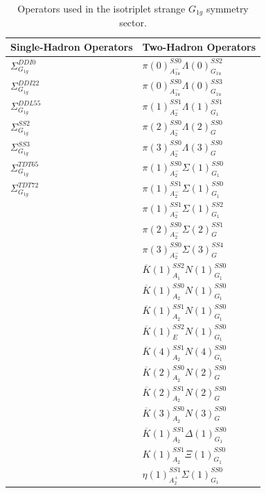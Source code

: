 \begin{table}
    \centering
    \begin{tabular}{l|l}
        \textbf{Single-Hadron Operators} & \textbf{Two-Hadron Operators} \\
        \hline
        $\Sigma_{G_{1g}}^{DDI0}$ & $\pi(0)_{A_{1u}^-}^{SS0}\Lambda(0)_{G_{1u}}^{SS2}$\\
        $\Sigma_{G_{1g}}^{DDI22}$ & $\pi(0)_{A_{1u}^-}^{SS0}\Lambda(0)_{G_{1u}}^{SS3}$\\
        $\Sigma_{G_{1g}}^{DDL55}$ & $\pi(1)_{A_2^-}^{SS1}\Lambda(1)_{G_1}^{SS1}$\\
        $\Sigma_{G_{1g}}^{SS2}$ & $\pi(2)_{A_2^-}^{SS0}\Lambda(2)_{G}^{SS0}$\\
        $\Sigma_{G_{1g}}^{SS3}$ & $\pi(3)_{A_2^-}^{SS0}\Lambda(3)_{G}^{SS0}$\\
        $\Sigma_{G_{1g}}^{TDT65}$ & $\pi(1)_{A_2^-}^{SS0}\Sigma(1)_{G_1}^{SS0}$\\
        $\Sigma_{G_{1g}}^{TDT72}$ & $\pi(1)_{A_2^-}^{SS1}\Sigma(1)_{G_1}^{SS0}$\\
        & $\pi(1)_{A_2^-}^{SS1}\Sigma(1)_{G_1}^{SS2}$\\
        & $\pi(2)_{A_2^-}^{SS0}\Sigma(2)_{G}^{SS1}$\\
        & $\pi(3)_{A_2^-}^{SS0}\Sigma(3)_{G}^{SS4}$\\
        & $\overline K(1)_{A_1}^{SS2}N(1)_{G_1}^{SS0}$\\
        & $\overline K(1)_{A_2}^{SS0}N(1)_{G_1}^{SS0}$\\
        & $\overline K(1)_{A_2}^{SS1}N(1)_{G_1}^{SS0}$\\
        & $\overline K(1)_{E}^{SS2}N(1)_{G_1}^{SS0}$\\
        & $\overline K(4)_{A_2}^{SS1}N(4)_{G_1}^{SS0}$\\
        & $\overline K(2)_{A_2}^{SS0}N(2)_{G}^{SS0}$\\
        & $\overline K(2)_{A_2}^{SS1}N(2)_{G}^{SS0}$\\
        & $\overline K(3)_{A_2}^{SS0}N(3)_{G}^{SS0}$\\
        & $\overline K(1)_{A_2}^{SS1}\Delta(1)_{G_1}^{SS0}$\\
        & $K(1)_{A_2}^{SS1}\Xi(1)_{G_1}^{SS0}$\\
        & $\eta(1)_{A_2^+}^{SS1}\Sigma(1)_{G_1}^{SS0}$
    \end{tabular}
    \caption{Operators used in the isotriplet strange $G_{1g}$ symmetry sector.}\label{table:g1g_ops}
\end{table}

